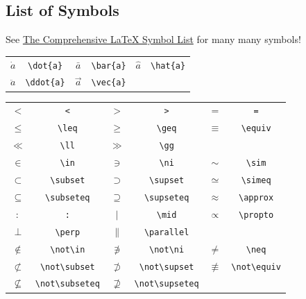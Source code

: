 \documentclass[a4paper,10pt]{article}
\begin{document}
    \subsection{List of Symbols}
    See \href{
        https://www.ctan.org/tex-archive/info/symbols/comprehensive
    }{The Comprehensive \LaTeX{} Symbol List} for many many symbols!
    \begin{table}[!htbp]
        \centering
        \begin{tabular}{cccccc}
            $\dot{a}$ & \verb|\dot{a}| &
            $\bar{a}$ & \verb|\bar{a}| &
            $\hat{a}$ & \verb|\hat{a}| \\
            $\ddot{a}$ & \verb|\ddot{a}| &
            $\vec{a}$ & \verb|\vec{a}| \\
        \end{tabular}
    \end{table}
    \begin{table}[!htbp]
        \centering
        \begin{tabular}{cccccc}
            $<$ & \verb|<| &
            $>$ & \verb|>| &
            $=$ & \verb|=| \\
            $\leq$ & \verb|\leq| &
            $\geq$ & \verb|\geq| &
            $\equiv$ & \verb|\equiv| \\
            $\ll$ & \verb|\ll| &
            $\gg$ & \verb|\gg| \\
            $\in$ & \verb|\in| &
            $\ni$ & \verb|\ni| &
            $\sim$ & \verb|\sim| \\
            $\subset$ & \verb|\subset| &
            $\supset$ & \verb|\supset| &
            $\simeq$ & \verb|\simeq| \\
            $\subseteq$ & \verb|\subseteq| &
            $\supseteq$ & \verb|\supseteq| &
            $\approx$ & \verb|\approx| \\
            $:$ & \verb|:| &
            $\mid$ & \verb|\mid| &
            $\propto$ & \verb|\propto| \\
            $\perp$ & \verb|\perp| &
            $\parallel$ & \verb|\parallel| \\
            $\not\in$ & \verb|\not\in| &
            $\not\ni$ & \verb|\not\ni| &
            $\neq$ & \verb|\neq| \\
            $\not\subset$ & \verb|\not\subset| &
            $\not\supset$ & \verb|\not\supset| &
            $\not\equiv$ & \verb|\not\equiv| \\
            $\not\subseteq$ & \verb|\not\subseteq| &
            $\not\supseteq$ & \verb|\not\supseteq| \\
        \end{tabular}
    \end{table}
\end{document}

